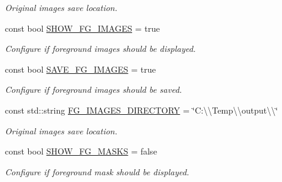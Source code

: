 \begin{DoxyCompactItemize}
\begin{DoxyCompactList}\small\item\em Original images save location. \end{DoxyCompactList}\item 
\mbox{\label{namespacedto_1_1_configuration_acf68b574dfdb40f7b348561f492f8c6a}} 
const bool \mbox{\hyperlink{namespacedto_1_1_configuration_acf68b574dfdb40f7b348561f492f8c6a}{S\+H\+O\+W\+\_\+\+F\+G\+\_\+\+I\+M\+A\+G\+ES}} = true
\begin{DoxyCompactList}\small\item\em Configure if foreground images should be displayed. \end{DoxyCompactList}\item 
\mbox{\label{namespacedto_1_1_configuration_ad58a8c1d241da28948450cc647db0d8a}} 
const bool \mbox{\hyperlink{namespacedto_1_1_configuration_ad58a8c1d241da28948450cc647db0d8a}{S\+A\+V\+E\+\_\+\+F\+G\+\_\+\+I\+M\+A\+G\+ES}} = true
\begin{DoxyCompactList}\small\item\em Configure if foreground images should be saved. \end{DoxyCompactList}\item 
\mbox{\label{namespacedto_1_1_configuration_a7301d8b8ba39923ff70d458dbb885d4b}} 
const std\+::string \mbox{\hyperlink{namespacedto_1_1_configuration_a7301d8b8ba39923ff70d458dbb885d4b}{F\+G\+\_\+\+I\+M\+A\+G\+E\+S\+\_\+\+D\+I\+R\+E\+C\+T\+O\+RY}} = \char`\"{}C\+:\textbackslash{}\textbackslash{}\+Temp\textbackslash{}\textbackslash{}output\textbackslash{}\textbackslash{}\char`\"{}
\begin{DoxyCompactList}\small\item\em Original images save location. \end{DoxyCompactList}\item 
\mbox{\label{namespacedto_1_1_configuration_ab32f201b75c3685732cb66f84ba81130}} 
const bool \mbox{\hyperlink{namespacedto_1_1_configuration_ab32f201b75c3685732cb66f84ba81130}{S\+H\+O\+W\+\_\+\+F\+G\+\_\+\+M\+A\+S\+KS}} = false
\begin{DoxyCompactList}\small\item\em Configure if foreground mask should be displayed. \end{DoxyCompactList}\item 

\end{DoxyCompactItemize}

